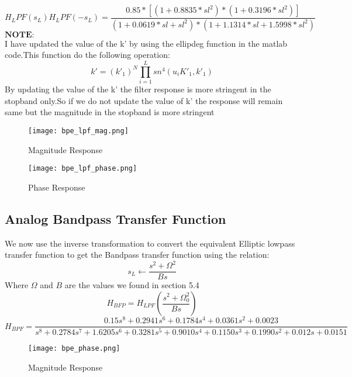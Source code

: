 \documentclass[12pt]{article}
\begin{document}
\begin{equation*}
    H_LPF(s_L)H_LPF(-s_L) = \frac{0.85*[(1 + 0.8835*sl^2)*(1 + 0.3196 * sl^2)]}{(1 + 0.0619 * sl + sl^2) * (1 + 1.1314 * sl + 1.5998 * sl^2)}
\end{equation*}
$\textbf{NOTE:}$\\
I have updated the value of the k' by using the ellipdeg function in the matlab code.This function do the following operation:
\begin{equation*}
    k' = (k'_1)^N{\displaystyle \prod_{i=1}^{L} sn^4(u_iK'_1,k'_1)}
\end{equation*}
By updating the value of the k' the filter response is more stringent in the stopband only.So if we do not update the value of k' the response will remain same but the magnitude in the stopband is more stringent








\begin{figure}[H]
\centering
\texttt{[image: bpe\_lpf\_mag.png]}
\caption{Magnitude Response}
\label{fig:mesh2}
\end{figure}
\begin{figure}[H]
\centering
\texttt{[image: bpe\_lpf\_phase.png]}
\caption{Phase Response}
\label{fig:mesh2}
\end{figure}
\subsection{\textbf{Analog Bandpass Transfer Function}}
We now use the inverse transformation to convert the equivalent Elliptic
lowpass transfer function to get the Bandpass transfer function using the
relation:
\begin{equation*}
    s_L \longleftarrow \frac{s^2+\Omega^2}{Bs}
\end{equation*}
Where $\Omega$ and $B$ are the values we found in section 5.4\\
\begin{equation*}
    H_{BFP}=H_{LPF}(\frac{s^2+\Omega_0^2}{Bs}) 
\end{equation*}
\begin{equation*}
    H_{BPF} = \frac{0.15s^8+0.2941s^6+0.1784s^4+0.0361s^2+0.0023}{s^8+0.2784s^7+1.6205s^6+0.3281s^5+0.9010s^4+0.1150s^3+0.1990s^2+0.012s+0.0151}
\end{equation*}
\begin{figure}[H]
\centering
\texttt{[image: bpe\_phase.png]}
\caption{Magnitude Response}
\label{fig:mesh2}
\end{figure}
\end{document}
